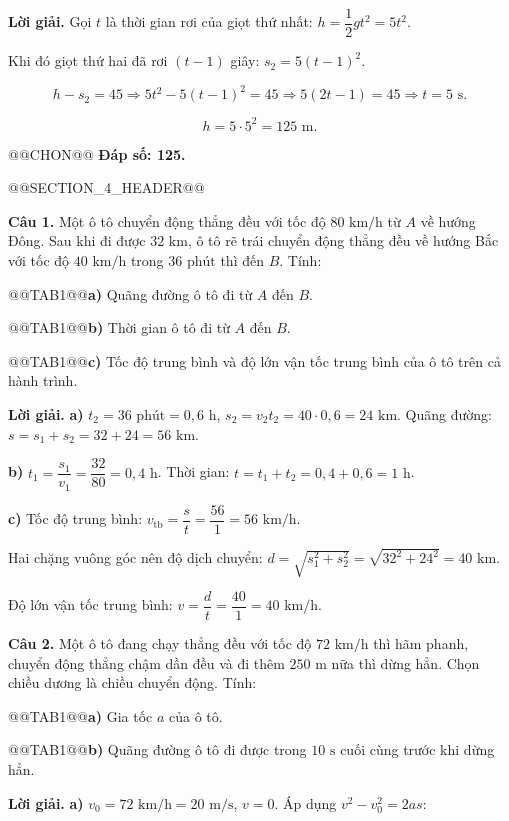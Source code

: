 \documentclass{article}
\begin{document}
\textbf{Lời giải.} Gọi $t$ là thời gian rơi của giọt thứ nhất: $h = \dfrac{1}{2}gt^2 = 5t^2$.

Khi đó giọt thứ hai đã rơi $(t - 1)$ giây: $s_2 = 5(t - 1)^2$.

\[h - s_2 = 45 \Rightarrow 5t^2 - 5(t - 1)^2 = 45 \Rightarrow 5(2t - 1) = 45 \Rightarrow t = 5\text{ s}.\]

\[h = 5 \cdot 5^2 = 125\text{ m}.\]

@@CHON@@ \textbf{Đáp số: 125.}

@@SECTION_4_HEADER@@

\textbf{Câu 1.} Một ô tô chuyển động thẳng đều với tốc độ $80\text{ km/h}$ từ $A$ về hướng Đông. Sau khi đi được $32\text{ km}$, ô tô rẽ trái chuyển động thẳng đều về hướng Bắc với tốc độ $40\text{ km/h}$ trong $36\text{ phút}$ thì đến $B$. Tính:

@@TAB1@@\textbf{a)} Quãng đường ô tô đi từ $A$ đến $B$.

@@TAB1@@\textbf{b)} Thời gian ô tô đi từ $A$ đến $B$.

@@TAB1@@\textbf{c)} Tốc độ trung bình và độ lớn vận tốc trung bình của ô tô trên cả hành trình.

\textbf{Lời giải.} \textbf{a)} $t_2 = 36\text{ phút} = 0{,}6\text{ h}$, $s_2 = v_2t_2 = 40 \cdot 0{,}6 = 24\text{ km}$. Quãng đường: $s = s_1 + s_2 = 32 + 24 = 56\text{ km}$.

\textbf{b)} $t_1 = \dfrac{s_1}{v_1} = \dfrac{32}{80} = 0{,}4\text{ h}$. Thời gian: $t = t_1 + t_2 = 0{,}4 + 0{,}6 = 1\text{ h}$.

\textbf{c)} Tốc độ trung bình: $v_{\text{tb}} = \dfrac{s}{t} = \dfrac{56}{1} = 56\text{ km/h}$.

Hai chặng vuông góc nên độ dịch chuyển: $d = \sqrt{s_1^2 + s_2^2} = \sqrt{32^2 + 24^2} = 40\text{ km}$.

Độ lớn vận tốc trung bình: $v = \dfrac{d}{t} = \dfrac{40}{1} = 40\text{ km/h}$.

\textbf{Câu 2.} Một ô tô đang chạy thẳng đều với tốc độ $72\text{ km/h}$ thì hãm phanh, chuyển động thẳng chậm dần đều và đi thêm $250\text{ m}$ nữa thì dừng hẳn. Chọn chiều dương là chiều chuyển động. Tính:

@@TAB1@@\textbf{a)} Gia tốc $a$ của ô tô.

@@TAB1@@\textbf{b)} Quãng đường ô tô đi được trong $10\text{ s}$ cuối cùng trước khi dừng hẳn.

\textbf{Lời giải.} \textbf{a)} $v_0 = 72\text{ km/h} = 20\text{ m/s}$, $v = 0$. Áp dụng $v^2 - v_0^2 = 2as$:
\end{document}
